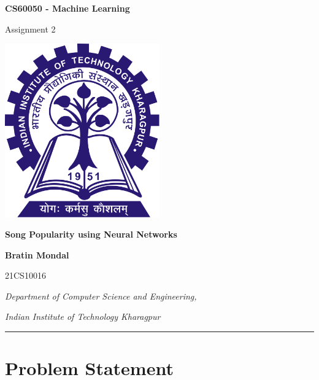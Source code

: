 \documentclass[12pt]{article}
\newcommand{\myName}{Bratin Mondal}
\newcommand{\myRollNumber}{21CS10016}
\newcommand{\myCourse}{CS60050 - Machine Learning}
\newcommand{\myAssignment}{2}
\newcommand{\myAssignmentTitle}{Song Popularity using Neural Networks}
\newcommand{\myUniversity}{Indian Institute of Technology Kharagpur}
\begin{document}
	
	\begin{titlepage}
		\centering
		
		{\Huge{\textbf{\myCourse}}}
		\vspace{0.5cm}
		
		{\Huge{Assignment \myAssignment}}
		
		\vspace{2cm}
		
		\includegraphics[width=0.5\textwidth]{iit_kgp_logo.png}
		
		\vspace{2cm}
		
		{\Huge\textbf{\myAssignmentTitle}}
		
		\vspace{2cm}
		
		{\Large\textbf{\myName}} 
		\vspace{0.2cm}
		
		\large{\myRollNumber}    
		\vspace{2cm}
		
		{\large\textit{Department of Computer Science and Engineering,}}
		
		{\large\textit{\myUniversity}}
		\vspace{0.3cm}
		
		\hrule 
		\vspace{0.5cm}
		
		
	\end{titlepage}
	
	\section{Problem Statement}
	
\end{document}
